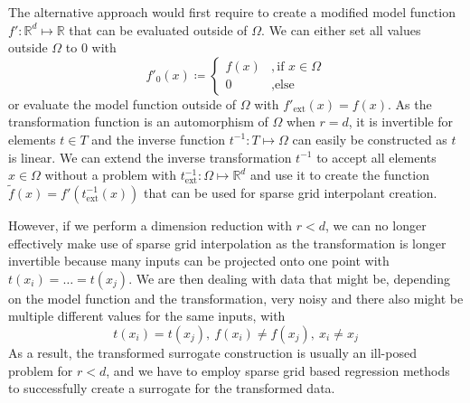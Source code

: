 \documentclass[
  a4paper,  %
  twoside,  %
  bibliography=totoc,
  headsepline,
  cleardoublepage=empty,
  parskip=half,
  draft=false
]{scrbook}
\begin{document}
The alternative approach would first require to create a modified model function $f' \colon \mathds{R}^d \mapsto \mathds{R}$ that can be evaluated outside of $\Omega$.
We can either set all values outside $\Omega$ to 0 with
\begin{equation}
f'_0(x) \coloneqq \begin{cases}
f(x)&, \text{if $x \in \Omega$}\\
0&,\text{else}
\end{cases}
\end{equation}
or evaluate the model function outside of $\Omega$ with $f'_{\text{ext}}(x)=f(x)$.
As the transformation function is an automorphism of $\Omega$ when $r=d$, it is invertible for elements $t \in T$ and the inverse function $t^{-1} \colon T \mapsto \Omega$ can easily be constructed as $t$ is linear.
We can extend the inverse transformation $t^{-1}$ to accept all elements $x \in \Omega$ without a problem with $t^{-1}_{\text{ext}} \colon \Omega \mapsto \mathds{R}^d$ and use it to create the function $\tilde{f}(x)=f'(t^{-1}_{\text{ext}}(x))$ that can be used for sparse grid interpolant creation.

However, if we perform a dimension reduction with $r < d$, we can no longer effectively make use of sparse grid interpolation as the transformation is longer invertible because many inputs can be projected onto one point with $t(x_i)=\dots=t(x_j)$.
We are then dealing with data that might be, depending on the model function and the transformation, very noisy and there also might be multiple different values for the same inputs, with
\begin{equation}
t(x_i)=t(x_j), ~ f(x_i) \neq f(x_j), ~ x_i \neq x_j
\end{equation}
As a result, the transformed surrogate construction is usually an ill-posed problem for $r < d$, and we have to employ sparse grid based regression methods to successfully create a surrogate for the transformed data.
\end{document}
